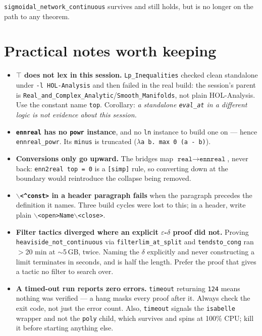 \documentclass[11pt,a4paper]{article}
\newcommand{\isa}[1]{\texttt{#1}}
\begin{document}
\isa{sigmoidal\_network\_continuous} survives and still holds, but is no longer on the path to
any theorem.

\section{Practical notes worth keeping}

\begin{itemize}
\item \textbf{\isa{\(\top\)} does not lex in this session.} \isa{Lp\_Inequalities} checked clean
  standalone under \isa{-l HOL-Analysis} and then failed in the real build: the session's parent
  is \isa{Real\_and\_Complex\_Analytic}/\isa{Smooth\_Manifolds}, not plain HOL-Analysis. Use the
  constant name \isa{top}. Corollary: \emph{a standalone \isa{eval\_at} in a different logic is
  not evidence about this session.}
\item \textbf{\isa{ennreal} has no \isa{powr} instance}, and no \isa{ln} instance to build one
  on --- hence \isa{ennreal\_powr}. Its \isa{minus} is truncated
  (\isa{\(\lambda\)a b. max 0 (a - b)}).
\item \textbf{Conversions only go upward.} The bridges map $\isa{real}\to\isa{ennreal}$, never
  back: \isa{enn2real top = 0} is a \isa{[simp]} rule, so converting down at the boundary would
  reintroduce the collapse being removed.
\item \textbf{\isa{\(\backslash\)<\^{}const>} in a header paragraph fails} when the paragraph
  precedes the definition it names. Three build cycles were lost to this; in a header, write
  plain \isa{\(\backslash\)<open>Name\(\backslash\)<close>}.
\item \textbf{Filter tactics diverged where an explicit $\varepsilon$-$\delta$ proof did not.}
  Proving \isa{heaviside\_not\_continuous} via \isa{filterlim\_at\_split} and \isa{tendsto\_cong}
  ran $>$20 min at $\sim$5\,GB, twice. Naming the $\delta$ explicitly and never constructing a
  limit terminates in seconds, and is half the length. Prefer the proof that gives a tactic no
  filter to search over.
\item \textbf{A timed-out run reports zero errors.} \isa{timeout} returning \isa{124} means
  nothing was verified --- a hang masks every proof after it. Always check the exit code, not
  just the error count. Also, \isa{timeout} signals the \isa{isabelle} wrapper and not the
  \isa{poly} child, which survives and spins at 100\% CPU; kill it before starting anything
  else.
\end{itemize}
\end{document}
